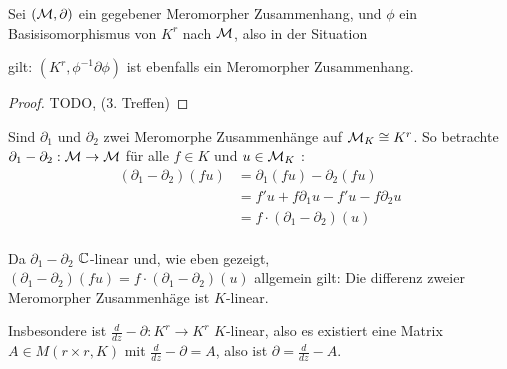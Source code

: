 \begin{lem}
  Sei $(\mathcal{M},\partial)$ ein gegebener Meromorpher Zusammenhang, und $\phi$ ein
  Basisisomorphismus von $K^r$ nach $\mathcal{M}$, also in der Situation
  \begin{center}
  \end{center}
  gilt: $(K^r,\phi^{-1}\partial\phi)$ ist ebenfalls ein Meromorpher Zusammenhang.
\end{lem}
\begin{proof}
  TODO, (3. Treffen)
\end{proof}

Sind $\partial_1$ und $\partial_2$ zwei Meromorphe Zusammenhänge auf $\mathcal{M}_K\cong
K^r$. So betrachte $\partial_1-\partial_2:\mathcal{M}\rightarrow\mathcal{M}$ für alle $f\in K$ 
und $u\in \mathcal{M}_K$ :
\begin{align*}
  (\partial_1-\partial_2)(fu) &= \partial_1(fu)-\partial_2(fu)\\
  &= f'u+f\partial_1u-f'u-f\partial_2u\\
  &= f\cdot(\partial_1-\partial_2)(u)\\
\end{align*}
\begin{lem}
  Da $\partial_1-\partial_2$ $\mathbb{C}$-linear und, wie eben gezeigt,
  $(\partial_1-\partial_2)(fu)=f\cdot(\partial_1-\partial_2)(u)$ allgemein
  gilt: Die differenz zweier Meromorpher Zusammenhäge ist $K$-linear.
\end{lem}
Insbesondere ist $\frac{d}{dz}-\partial:K^r\rightarrow K^r$ $K$-linear, also es
existiert eine Matrix $A\in M(r\times r,K)$ mit $\frac{d}{dz}-\partial=A$, also
ist $\partial=\frac{d}{dz}-A$.

